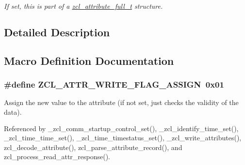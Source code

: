 \begin{DoxyCompactItemize}
\begin{DoxyCompactList}\small\item\em If set, this is part of a \hyperlink{structzcl__attribute__full__t}{zcl\-\_\-attribute\-\_\-full\-\_\-t} structure. \end{DoxyCompactList}\end{DoxyCompactItemize}


\subsection{Detailed Description}


\subsection{Macro Definition Documentation}
\hypertarget{group__zcl_ga2bb65a6c04a14957000feaa12de9769c}{
\subsubsection[{Z\-C\-L\-\_\-\-A\-T\-T\-R\-\_\-\-W\-R\-I\-T\-E\-\_\-\-F\-L\-A\-G\-\_\-\-A\-S\-S\-I\-G\-N}]{\setlength{\rightskip}{0pt plus 5cm}\#define Z\-C\-L\-\_\-\-A\-T\-T\-R\-\_\-\-W\-R\-I\-T\-E\-\_\-\-F\-L\-A\-G\-\_\-\-A\-S\-S\-I\-G\-N~0x01}}\label{group__zcl_ga2bb65a6c04a14957000feaa12de9769c}


Assign the new value to the attribute (if not set, just checks the validity of the data). 



Referenced by \-\_\-zcl\-\_\-comm\-\_\-startup\-\_\-control\-\_\-set(), \-\_\-zcl\-\_\-identify\-\_\-time\-\_\-set(), \-\_\-zcl\-\_\-time\-\_\-time\-\_\-set(), \-\_\-zcl\-\_\-time\-\_\-timestatus\-\_\-set(), \-\_\-zcl\-\_\-write\-\_\-attributes(), zcl\-\_\-decode\-\_\-attribute(), zcl\-\_\-parse\-\_\-attribute\-\_\-record(), and zcl\-\_\-process\-\_\-read\-\_\-attr\-\_\-response().

